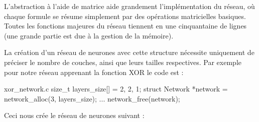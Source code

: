 L'abstraction à l'aide de matrice aide grandement l'implémentation du réseau,
où chaque formule se résume simplement par des opérations matricielles basiques.
Toutes les fonctions majeures du réseau tiennent en une cinquantaine de lignes
(une grande partie est due à la gestion de la mémoire).

La création d'un réseau de neurones avec cette structure nécessite uniquement de
préciser le nombre de couches, ainsi que leurs tailles respectives. Par exemple
pour notre réseau apprenant la fonction XOR le code est :

\begin{myminted}{xor\_network.c}
size_t layers_size[] = {2, 2, 1};
struct Network *network = network_alloc(3, layers_size);
...
network_free(network);
\end{myminted}

Ceci nous crée le réseau de neurones suivant :

\def\layersep{2.5cm}
\vspace{1cm}
\begin{center}
\end{center}

